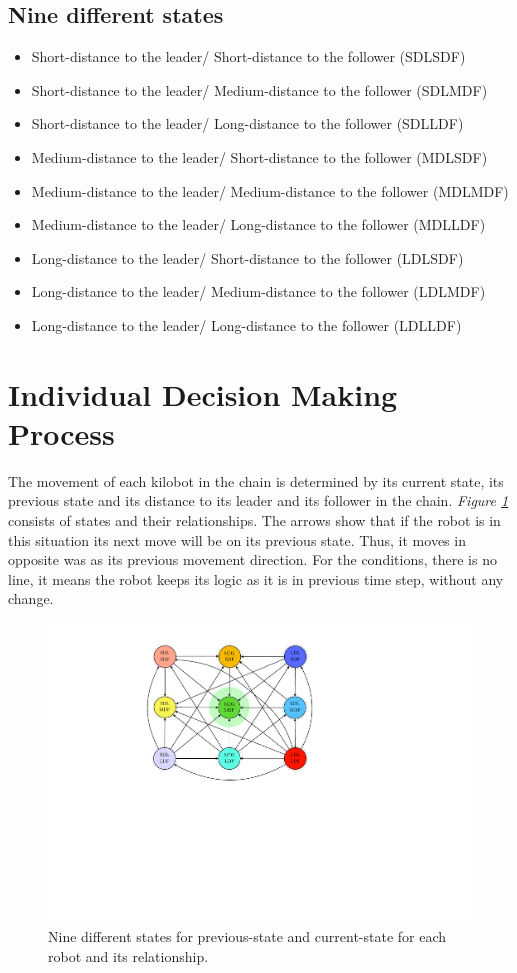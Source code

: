 \documentclass[11pt,a4paper]{article}
\begin{document}
\subsection{Nine different states}
\begin{itemize}
    \item Short-distance to the leader/ Short-distance to the follower (SDLSDF)   
    \item Short-distance to the leader/ Medium-distance to the follower (SDLMDF)
    \item Short-distance to the leader/ Long-distance to the follower (SDLLDF)   
    \item Medium-distance to the leader/ Short-distance to the follower  (MDLSDF) 
    \item Medium-distance to the leader/ Medium-distance to the follower  (MDLMDF) 
    \item Medium-distance to the leader/ Long-distance to the follower (MDLLDF) 
    \item Long-distance to the leader/ Short-distance to the follower (LDLSDF) 
    \item Long-distance to the leader/ Medium-distance to the follower (LDLMDF) 
    \item Long-distance to the leader/ Long-distance to the follower (LDLLDF) 
\end{itemize}
 \section{Individual Decision Making Process }
 The movement of each kilobot in the chain is determined by its current state, its previous state and its distance to its leader and its follower in the chain. \textit{Figure \ref{fig:states}} consists of states and their relationships. The arrows show that if the robot is in this situation its next move will be on its previous state. Thus, it moves in opposite was as its previous movement direction. For the conditions, there is no line, it means the robot keeps its logic as it is in previous time step, without any change. 
 
 \begin{figure}[h]
     \centering
 \includegraphics[scale=0.7]{Figs/States.pdf}
     \caption{Nine different states for previous-state and current-state for each robot and its relationship.  }
     \label{fig:states}
  \end{figure}
 



\end{document}
